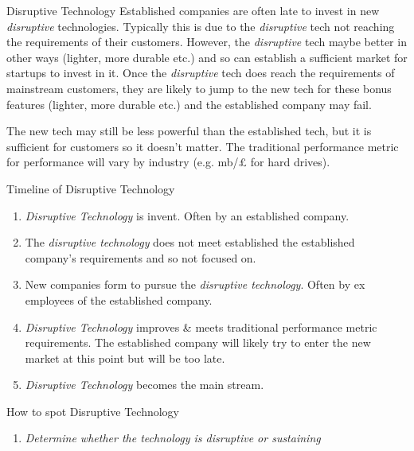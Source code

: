 \documentclass[11pt,a4paper]{article}
\begin{document}
  \begin{proposition}{Disruptive Technology}
    Established companies are often late to invest in new \textit{disruptive} technologies. Typically this is due to the \textit{disruptive} tech not reaching the requirements of their customers. However, the \textit{disruptive} tech maybe better in other ways (lighter, more durable etc.) and so can establish a sufficient market for startups to invest in it. Once the \textit{disruptive} tech does reach the requirements of mainstream customers, they are likely to jump to the new tech for these bonus features (lighter, more durable etc.) and the established company may fail.
    \par The new tech may still be less powerful than the established tech, but it is sufficient for customers so it doesn't matter. The traditional performance metric for performance will vary by industry (e.g. mb/£ for hard drives).
  \end{proposition}

  \begin{proposition}{Timeline of Disruptive Technology}
    \begin{enumerate}
      \item \textit{Disruptive Technology} is invent. Often by an established company.
      \item The \textit{disruptive technology} does not meet established the established company's requirements and so not focused on.
      \item New companies form to pursue the \textit{disruptive technology}. Often by ex employees of the established company.
      \item \textit{Disruptive Technology} improves \& meets traditional performance metric requirements. The established company will likely try to enter the new market at this point but will be too late.
      \item \textit{Disruptive Technology} becomes the main stream.
    \end{enumerate}
  \end{proposition}

  \begin{proposition}{How to spot Disruptive Technology}
    \begin{enumerate}
      \item \textit{Determine whether the technology is disruptive or sustaining}
    \end{enumerate}
  \end{proposition}
\end{document}
